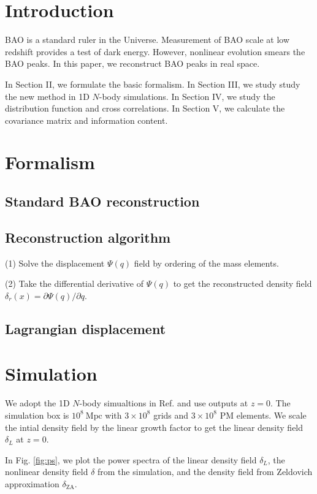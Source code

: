 \documentclass[aps,prd,twocolumn,showpacs,superscriptaddress,groupedaddress,nofootinbib]{revtex4}  %
\newcommand{\mr}{\mathrm}
\begin{document}
\section{Introduction}

BAO is a standard ruler in the Universe.
Measurement of BAO scale at low
redshift provides a test of dark energy. However, nonlinear evolution 
smears the BAO peaks.
In this paper, we reconstruct BAO peaks in real space.

In Section II, we formulate the basic formalism. In Section III,
we study study the new method in 1D $N$-body simulations. In Section IV,
we study the distribution function and cross correlations. In Section V, 
we calculate the covariance matrix and information content.

\section{Formalism}
\subsection{Standard BAO reconstruction}
\subsection{Reconstruction algorithm}
(1) Solve the displacement $\Psi(q)$ field by ordering of the mass elements.

(2) Take the differential derivative of $\Psi(q)$ to get the reconstructed
density field $\delta_r(x)=\partial\Psi(q)/\partial q$.


\subsection{Lagrangian displacement}



\section{Simulation}

We adopt the 1D $N$-body simualtions in Ref. \cite{2016matt}
and use outputs at $z=0$. The simulation box is $10^8\ \mr{Mpc}$ with 
$3\times10^8$ grids and $3\times10^8$ PM elements.
We scale the intial density field by the linear
growth factor to get the linear density field $\delta_L$ at $z=0$. 

In Fig. \ref{fig:ps}, we plot the power spectra of the linear density field
$\delta_{L}$, the nonlinear density field $\delta$ from the simulation,
and the density field from Zeldovich approximation $\delta_\mr{ZA}$.
\end{document}
